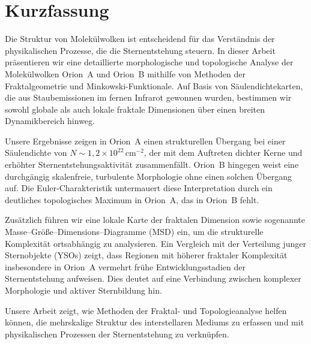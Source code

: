 \chapter{Kurzfassung}

Die Struktur von Molekülwolken ist entscheidend für das Verständnis der physikalischen Prozesse, die die Sternentstehung steuern. In dieser Arbeit präsentieren wir eine detaillierte morphologische und topologische Analyse der Molekülwolken Orion~A und Orion~B mithilfe von Methoden der Fraktalgeometrie und Minkowski-Funktionale. Auf Basis von Säulendichtekarten, die aus Staubemissionen im fernen Infrarot gewonnen wurden, bestimmen wir sowohl globale als auch lokale fraktale Dimensionen über einen breiten Dynamikbereich hinweg.

Unsere Ergebnisse zeigen in Orion~A einen strukturellen Übergang bei einer Säulendichte von $N \sim 1{,}2 \times 10^{22} \,\mathrm{cm}^{-2}$, der mit dem Auftreten dichter Kerne und erhöhter Sternentstehungsaktivität zusammenfällt. Orion~B hingegen weist eine durchgängig skalenfreie, turbulente Morphologie ohne einen solchen Übergang auf. Die Euler-Charakteristik untermauert diese Interpretation durch ein deutliches topologisches Maximum in Orion~A, das in Orion~B fehlt. 

Zusätzlich führen wir eine lokale Karte der fraktalen Dimension sowie sogenannte Masse–Größe–Dimensions–Diagramme (MSD) ein, um die strukturelle Komplexität ortsabhängig zu analysieren. Ein Vergleich mit der Verteilung junger Sternobjekte (YSOs) zeigt, dass Regionen mit höherer fraktaler Komplexität insbesondere in Orion~A vermehrt frühe Entwicklungsstadien der Sternentstehung aufweisen. Dies deutet auf eine Verbindung zwischen komplexer Morphologie und aktiver Sternbildung hin.

Unsere Arbeit zeigt, wie Methoden der Fraktal- und Topologieanalyse helfen können, die mehrskalige Struktur des interstellaren Mediums zu erfassen und mit physikalischen Prozessen der Sternentstehung zu verknüpfen.

\clearpage
